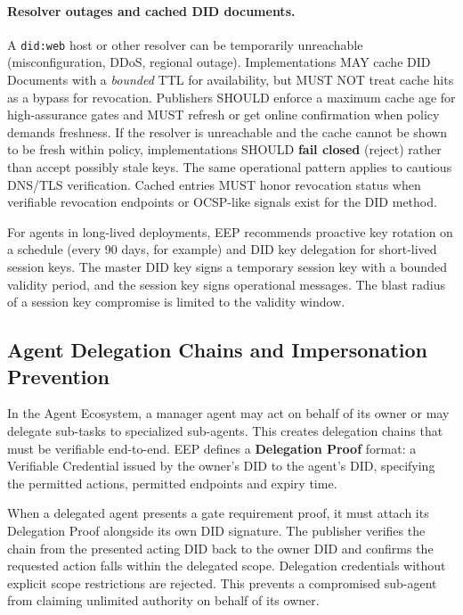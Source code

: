 \documentclass[12pt,a4paper]{article}
\begin{document}
\paragraph{Resolver outages and cached DID documents.}
A \texttt{did:web} host or other resolver can be temporarily unreachable (misconfiguration, DDoS, regional outage). Implementations MAY cache DID Documents with a \emph{bounded} TTL for availability, but MUST NOT treat cache hits as a bypass for revocation. Publishers SHOULD enforce a maximum cache age for high-assurance gates and MUST refresh or get online confirmation when policy demands freshness. If the resolver is unreachable and the cache cannot be shown to be fresh within policy, implementations SHOULD \textbf{fail closed} (reject) rather than accept possibly stale keys. The same operational pattern applies to cautious DNS/TLS verification. Cached entries MUST honor revocation status when verifiable revocation endpoints or OCSP-like signals exist for the DID method.

For agents in long-lived deployments, EEP recommends proactive key rotation on a schedule (every 90 days, for example) and DID key delegation for short-lived session keys. The master DID key signs a temporary session key with a bounded validity period, and the session key signs operational messages. The blast radius of a session key compromise is limited to the validity window.

\subsection{Agent Delegation Chains and Impersonation Prevention}

In the Agent Ecosystem, a manager agent may act on behalf of its owner or may delegate sub-tasks to specialized sub-agents. This creates delegation chains that must be verifiable end-to-end. EEP defines a \textbf{Delegation Proof} format: a Verifiable Credential issued by the owner's DID to the agent's DID, specifying the permitted actions, permitted endpoints and expiry time.

When a delegated agent presents a gate requirement proof, it must attach its Delegation Proof alongside its own DID signature. The publisher verifies the chain from the presented acting DID back to the owner DID and confirms the requested action falls within the delegated scope. Delegation credentials without explicit scope restrictions are rejected. This prevents a compromised sub-agent from claiming unlimited authority on behalf of its owner.
\end{document}
